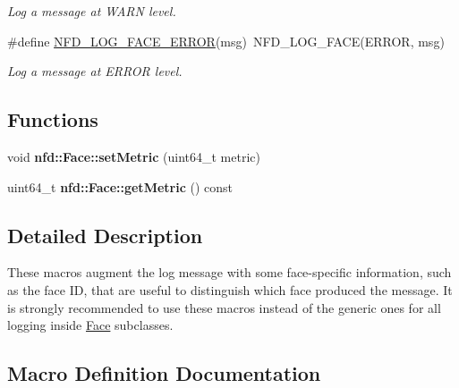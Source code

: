 \begin{DoxyCompactItemize}
\begin{DoxyCompactList}\small\item\em Log a message at W\+A\+RN level. \end{DoxyCompactList}\item 
\#define \hyperlink{group__FaceLogging_ga0ab8768ec566c3427c7541f0eb2256e2}{N\+F\+D\+\_\+\+L\+O\+G\+\_\+\+F\+A\+C\+E\+\_\+\+E\+R\+R\+OR}(msg)~N\+F\+D\+\_\+\+L\+O\+G\+\_\+\+F\+A\+CE(E\+R\+R\+OR, msg)\hypertarget{group__FaceLogging_ga0ab8768ec566c3427c7541f0eb2256e2}{}\label{group__FaceLogging_ga0ab8768ec566c3427c7541f0eb2256e2}

\begin{DoxyCompactList}\small\item\em Log a message at E\+R\+R\+OR level. \end{DoxyCompactList}\end{DoxyCompactItemize}
\subsection*{Functions}
\begin{DoxyCompactItemize}
\item 
void {\bfseries nfd\+::\+Face\+::set\+Metric} (uint64\+\_\+t metric)\hypertarget{group__FaceLogging_ga78caf811363354a46578457d2c561b23}{}\label{group__FaceLogging_ga78caf811363354a46578457d2c561b23}

\item 
uint64\+\_\+t {\bfseries nfd\+::\+Face\+::get\+Metric} () const\hypertarget{group__FaceLogging_ga735b0737c5070df5b484b318491a2276}{}\label{group__FaceLogging_ga735b0737c5070df5b484b318491a2276}

\end{DoxyCompactItemize}


\subsection{Detailed Description}
These macros augment the log message with some face-\/specific information, such as the face ID, that are useful to distinguish which face produced the message. It is strongly recommended to use these macros instead of the generic ones for all logging inside \hyperlink{classnfd_1_1Face}{Face} subclasses. 

\subsection{Macro Definition Documentation}

